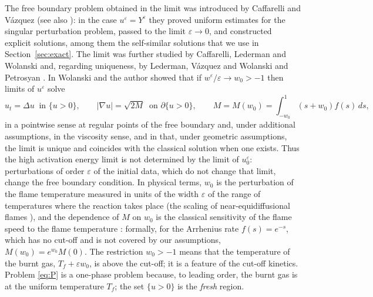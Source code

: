 \documentclass[11pt]{amsart}
\theoremstyle{definition}
\theoremstyle{remark}
\newcommand{\ve}{\varepsilon}
\begin{document}
The free boundary problem obtained in the limit was introduced by Caffarelli
and V\'azquez \cite{CaffarelliVazquez1995} (see also \cite{Vazquez1996}): in
the case $u^\ve=Y^\ve$ they proved uniform estimates for the singular
perturbation problem, passed to the limit
$\ve\to0$, and constructed explicit solutions, among them the self-similar
solutions that we use in Section~\ref{sec:exact}. The limit was further studied by
Caffarelli, Lederman and Wolanski
\cite{CaffarelliLedermanWolanski1997a} and, regarding
uniqueness, by Lederman, V\'azquez and Wolanski \cite{LedermanVazquezWolanski2001}
and Petrosyan \cite{Petrosyan2002}. In \cite{FernandezBonderWolanski2000} Wolanski
and the author showed that if $w^\ve/\ve\to w_0>-1$ then limits of $u^\ve$ solve
\begin{equation}\label{eq:P}\tag{$P$}
u_t=\Delta u\ \text{ in }\{u>0\},\qquad |\nabla u|=\sqrt{2M}\ \text{ on }\partial\{u>0\},\qquad
M=M(w_0)=\int_{-w_0}^1(s+w_0)f(s)\,ds,
\end{equation}
in a pointwise sense at regular points of the free boundary and, under additional
assumptions, in the viscosity sense, and in \cite{FernandezBonderWolanski2004} that, under
geometric assumptions, the limit is unique and coincides with the classical
solution when one exists. Thus the high activation energy limit is not determined by
the limit of $u^\ve_0$: perturbations of order $\ve$ of the initial data, which do
not change that limit, change the free boundary condition. In physical terms, $w_0$ is the
perturbation of the flame temperature measured in units of the width $\ve$ of the range of
temperatures where the reaction takes place (the scaling of near-equidiffusional flames
\cite{MatkowskySivashinsky1979}), and the dependence of $M$ on $w_0$ is the classical
sensitivity of the flame speed to the flame temperature
\cite{ZeldovichFrankKamenetskii1938}: formally, for the Arrhenius rate $f(s)=e^{-s}$, which
has no cut-off and is not covered by our assumptions, $M(w_0)=e^{w_0}M(0)$. The
restriction $w_0>-1$ means that the temperature of the burnt gas, $T_f+\ve w_0$, is above
the cut-off; it is a feature of the cut-off kinetics. Problem \eqref{eq:P} is a
one-phase problem because, to leading order, the burnt gas is at the uniform
temperature $T_f$; the set $\{u>0\}$ is the \emph{fresh} region.
\end{document}
